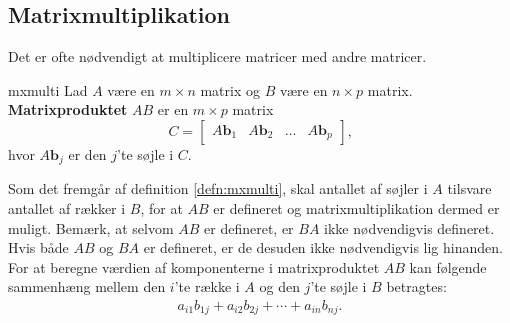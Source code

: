 \subsection{Matrixmultiplikation}

Det er ofte nødvendigt at multiplicere matricer med andre matricer. 
\begin{defn}{}{mxmulti}
Lad $A$ være en $m \times n$ matrix og $B$ være en $n \times p$ matrix.
\textbf{Matrixproduktet} $AB$  er en $m \times p$ matrix 
$$
C=
\begin{bmatrix}
A\textbf{b}_1 & A\textbf{b}_2 & \ldots & A\textbf{b}_p
\end{bmatrix}\text{,}
$$
hvor $A\textbf{b}_j$ er den $j$'te søjle i $C$.
\end{defn}
\noindent
%
Som det fremgår af definition \ref{defn:mxmulti}, skal antallet af søjler i $A$ tilsvare antallet af rækker i $B$, for at $AB$ er defineret og matrixmultiplikation dermed er muligt. 
Bemærk, at selvom $AB$ er defineret, er $BA$ ikke nødvendigvis defineret. 
Hvis både $AB$ og $BA$ er defineret, er de desuden ikke nødvendigvis lig hinanden. 
For at beregne værdien af komponenterne i matrixproduktet $AB$ kan følgende sammenhæng mellem den $i$'te række i $A$ og den $j$'te søjle i $B$ betragtes: 
\begin{align*}
a_{i1}b_{1j} + a_{i2}b_{2j} + \cdots + a_{in}b_{nj}
\text{.}
\end{align*}
%
